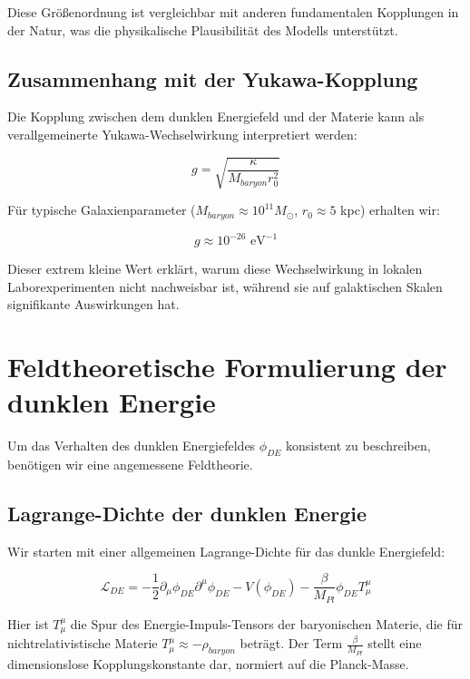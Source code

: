 \documentclass[a4paper,12pt]{article}
\begin{document}
Diese Größenordnung ist vergleichbar mit anderen fundamentalen Kopplungen in der Natur, was die physikalische Plausibilität des Modells unterstützt.

\subsection{Zusammenhang mit der Yukawa-Kopplung}

Die Kopplung zwischen dem dunklen Energiefeld und der Materie kann als verallgemeinerte Yukawa-Wechselwirkung interpretiert werden:

\begin{equation}
g = \sqrt{\frac{\kappa}{M_{baryon} r_0^2}}
\end{equation}

Für typische Galaxienparameter ($M_{baryon} \approx 10^{11} M_{\odot}$, $r_0 \approx 5$ kpc) erhalten wir:

\begin{equation}
g \approx 10^{-26} \text{ eV}^{-1}
\end{equation}

Dieser extrem kleine Wert erklärt, warum diese Wechselwirkung in lokalen Laborexperimenten nicht nachweisbar ist, während sie auf galaktischen Skalen signifikante Auswirkungen hat.
\section{Feldtheoretische Formulierung der dunklen Energie}

Um das Verhalten des dunklen Energiefeldes $\phi_{DE}$ konsistent zu beschreiben, benötigen wir eine angemessene Feldtheorie. 

\subsection{Lagrange-Dichte der dunklen Energie}

Wir starten mit einer allgemeinen Lagrange-Dichte für das dunkle Energiefeld:

\begin{equation}
	\mathcal{L}_{DE} = -\frac{1}{2}\partial_\mu \phi_{DE} \partial^\mu \phi_{DE} - V(\phi_{DE}) - \frac{\beta}{M_{Pl}} \phi_{DE} T^{\mu}_{\mu}
\end{equation}

Hier ist $T^{\mu}_{\mu}$ die Spur des Energie-Impuls-Tensors der baryonischen Materie, die für nichtrelativistische Materie $T^{\mu}_{\mu} \approx -\rho_{baryon}$ beträgt. Der Term $\frac{\beta}{M_{Pl}}$ stellt eine dimensionslose Kopplungskonstante dar, normiert auf die Planck-Masse.
\end{document}
